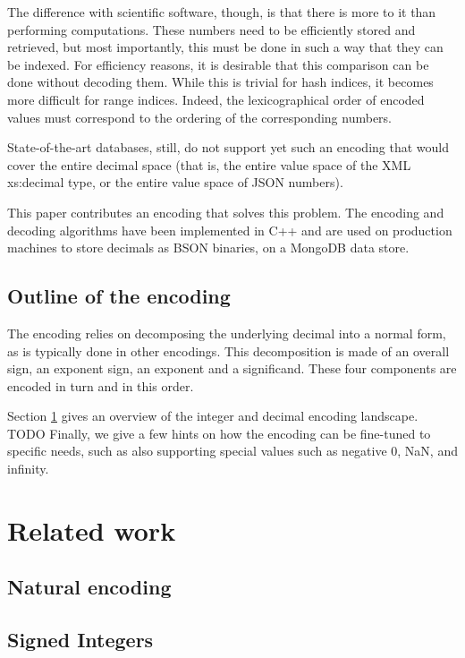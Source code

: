 \documentclass{acm_proc_article-sp}
\begin{document}
The difference with scientific software, though, is that there is more to it than performing computations. These numbers need to be efficiently stored and retrieved, but most importantly, this must be done in such a way that they can be indexed. For efficiency reasons, it is desirable that this comparison can be done without decoding them. While this is trivial for hash indices, it becomes more difficult for range indices. Indeed, the lexicographical order of encoded values must correspond to the ordering of the corresponding numbers.

State-of-the-art databases, still, do not support yet such an encoding that would cover the entire decimal space (that is, the entire value space of the XML xs:decimal type, or the entire value space of JSON numbers).

This paper contributes an encoding that solves this problem. The encoding and decoding algorithms have been implemented in C++ and are used on production machines to store decimals as BSON binaries, on a MongoDB data store.

\subsection{Outline of the encoding}

The encoding relies on decomposing the underlying decimal into a normal form, as is typically done in other encodings. This decomposition is made of an overall sign, an exponent sign, an exponent and a significand. These four components are encoded in turn and in this order.

Section \ref{section-related-work} gives an overview of the integer and decimal encoding landscape.
TODO
Finally, we give a few hints on how the encoding can be fine-tuned to specific needs, such as also supporting special values such as negative 0, NaN, and infinity.

\section{Related work}
\label{section-related-work}

\subsection{Natural encoding}

\subsection{Signed Integers}
\end{document}
